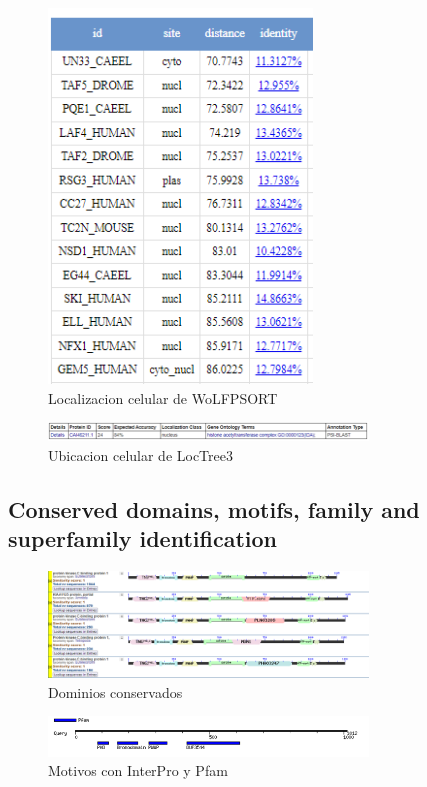 \documentclass[journal,transmag]{IEEEtran}
\begin{document}
\begin{figure}[!h]
	\center
	\includegraphics[width=7cm]{imagenes/loca.png}
	\caption{Localizacion celular de WoLFPSORT}
	\label{6}
\end{figure}

\begin{figure}[!h]
	\center
	\includegraphics[width=8.5cm]{imagenes/loca2.png}
	\caption{Ubicacion celular de LocTree3}
	\label{7}
\end{figure}

\subsection{\textbf{ Conserved domains, motifs, family and superfamily identification}}

\begin{figure}[!h]
	\center
	\includegraphics[width=8.5cm]{imagenes/dominios.png}
	\caption{Dominios conservados}
	\label{8}
\end{figure}

\begin{figure}[!h]
	\center
	\includegraphics[width=8.5cm]{imagenes/motivos.png}
	\caption{Motivos con InterPro y Pfam}
	\label{9}
\end{figure}
\end{document}
